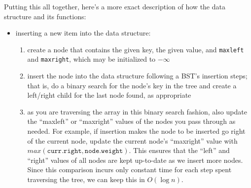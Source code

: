 \documentclass[12pt]{article}
\begin{document}
\begin{enumerate}
    Putting this all together, here's a more exact description of how the data structure and its functions:

    \begin{itemize}
        \item inserting a new item into the data structure:
        \begin{enumerate}
            \item create a node that contains the given key, the given value, and \texttt{maxleft} and \texttt{maxright}, which 
            may be initialized to $-\infty$
            \item insert the node into the data structure following a BST's insertion steps; that is, do a binary search 
            for the node's key in the tree and create a left/right child for the last node found, as appropriate
            \item as you are traversing the array in this binary search fashion, also update the ``maxleft'' or ``maxright'' values 
            of the nodes you pass through as needed. For example, if insertion makes the node to be inserted go right of the current node, 
            update the current node's ``maxright'' value with $max(\texttt{curr.right}, \texttt{node.weight})$. This 
            ensures that the ``left'' and ``right'' values of all nodes are kept up-to-date as we insert more nodes. 
            Since this comparison incurs only constant time for each step spent traversing the tree, we can keep this in 
            $O(\log n)$.
        \end{enumerate}


\end{itemize}
\end{enumerate}
\end{document}
